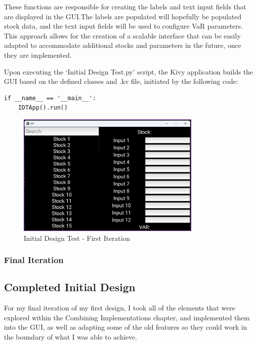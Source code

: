 \documentclass{article}
\begin{document}
These functions are responsible for creating the labels and text input fields that are displayed in the GUI.\@ The labels are populated will hopefully be populated stock data, and the text input fields will be used to configure VaR parameters.  This approach allows for the creation of a scalable interface that can be easily adapted to accommodate additional stocks and parameters in the future, once they are implemented.\\\vspace{0.3cm}

Upon executing the `Initial Design Test.py' script, the Kivy application builds the GUI based on the defined classes and .kv file, initiated by the following code:

\begin{verbatim}
if __name__ == '__main__':
    IDTApp().run()
\end{verbatim}

\begin{figure}[h!]
  \centering
  \includegraphics[width=0.8\textwidth]{Images/Initial Design Test Image 1.png}
  \caption{Initial Design Test - First Iteration}
  \label{fig:Initial Design Test - First Iteration}
\end{figure}

\newpage

\subsubsection{Final Iteration}

\subsection{Completed Initial Design}
For my final iteration of my first design, I took all of the elements that were explored within the Combining Implementations chapter, and implemented them into the GUI, as well as adapting some of the old features so they could work in the boundary of what I was able to achieve.
\end{document}
